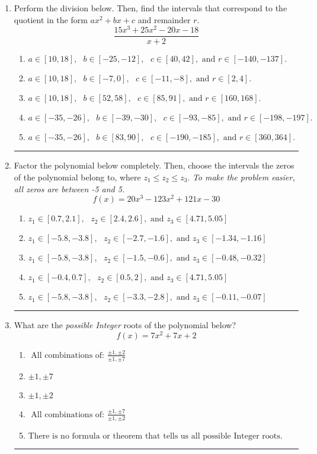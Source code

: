 \documentclass[14pt]{extbook}
\newcommand{\litem}[1]{\item#1\hspace*{-1cm}\rule{\textwidth}{0.4pt}}
\begin{document}
\begin{enumerate}
{\begin{enumerate}[label=\Alph*.]
\end{enumerate} }
\litem{
Perform the division below. Then, find the intervals that correspond to the quotient in the form $ax^2+bx+c$ and remainder $r$.\[ \frac{15x^{3} +25 x^{2} -20 x -18}{x + 2} \]\begin{enumerate}[label=\Alph*.]
\item \( a \in [10, 18], \text{   } b \in [-25, -12], \text{   } c \in [40, 42], \text{   and   } r \in [-140, -137]. \)
\item \( a \in [10, 18], \text{   } b \in [-7, 0], \text{   } c \in [-11, -8], \text{   and   } r \in [2, 4]. \)
\item \( a \in [10, 18], \text{   } b \in [52, 58], \text{   } c \in [85, 91], \text{   and   } r \in [160, 168]. \)
\item \( a \in [-35, -26], \text{   } b \in [-39, -30], \text{   } c \in [-93, -85], \text{   and   } r \in [-198, -197]. \)
\item \( a \in [-35, -26], \text{   } b \in [83, 90], \text{   } c \in [-190, -185], \text{   and   } r \in [360, 364]. \)

\end{enumerate} }
\litem{
Factor the polynomial below completely. Then, choose the intervals the zeros of the polynomial belong to, where $z_1 \leq z_2 \leq z_3$. \textit{To make the problem easier, all zeros are between -5 and 5.}\[ f(x) = 20x^{3} -123 x^{2} +121 x -30 \]\begin{enumerate}[label=\Alph*.]
\item \( z_1 \in [0.7, 2.1], \text{   }  z_2 \in [2.4, 2.6], \text{   and   } z_3 \in [4.71, 5.05] \)
\item \( z_1 \in [-5.8, -3.8], \text{   }  z_2 \in [-2.7, -1.6], \text{   and   } z_3 \in [-1.34, -1.16] \)
\item \( z_1 \in [-5.8, -3.8], \text{   }  z_2 \in [-1.5, -0.6], \text{   and   } z_3 \in [-0.48, -0.32] \)
\item \( z_1 \in [-0.4, 0.7], \text{   }  z_2 \in [0.5, 2], \text{   and   } z_3 \in [4.71, 5.05] \)
\item \( z_1 \in [-5.8, -3.8], \text{   }  z_2 \in [-3.3, -2.8], \text{   and   } z_3 \in [-0.11, -0.07] \)

\end{enumerate} }
\litem{
What are the \textit{possible Integer} roots of the polynomial below?\[ f(x) = 7x^{2} +7 x + 2 \]\begin{enumerate}[label=\Alph*.]
\item \( \text{ All combinations of: }\frac{\pm 1,\pm 2}{\pm 1,\pm 7} \)
\item \( \pm 1,\pm 7 \)
\item \( \pm 1,\pm 2 \)
\item \( \text{ All combinations of: }\frac{\pm 1,\pm 7}{\pm 1,\pm 2} \)
\item \( \text{There is no formula or theorem that tells us all possible Integer roots.} \)


\end{enumerate}}
\end{enumerate}
\end{document}
